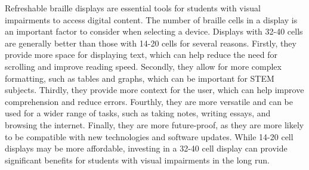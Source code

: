 Refreshable braille displays are essential tools for students with visual impairments to access digital content. The number of braille cells in a display is an important factor to consider when selecting a device. Displays with 32-40 cells are generally better than those with 14-20 cells for several reasons. Firstly, they provide more space for displaying text, which can help reduce the need for scrolling and improve reading speed. Secondly, they allow for more complex formatting, such as tables and graphs, which can be important for STEM subjects. Thirdly, they provide more context for the user, which can help improve comprehension and reduce errors. Fourthly, they are more versatile and can be used for a wider range of tasks, such as taking notes, writing essays, and browsing the internet. Finally, they are more future-proof, as they are more likely to be compatible with new technologies and software updates. While 14-20 cell displays may be more affordable, investing in a 32-40 cell display can provide significant benefits for students with visual impairments in the long run.


